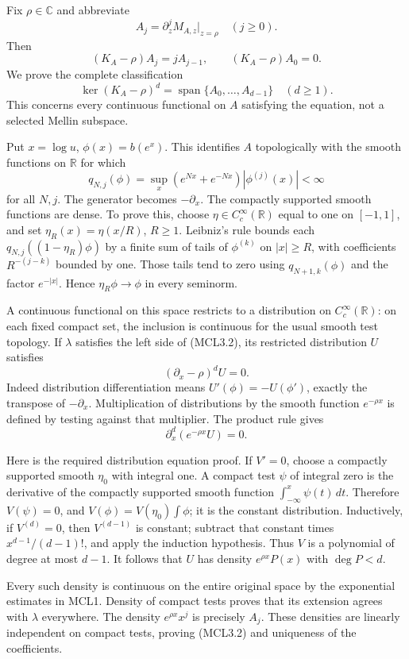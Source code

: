 Fix \(\rho\in\mathbb C\) and abbreviate \[
 A_j=\partial_z^jM_{A,z}\big|_{z=\rho}\quad(j\ge0).
\] Then \[
 (K_A-\rho)A_j=jA_{j-1},\qquad
 (K_A-\rho)A_0=0.
 \tag{MCL3.1}
\] We prove the complete classification \[
 \boxed{\ker(K_A-\rho)^d
       =\operatorname{span}\{A_0,\ldots,A_{d-1}\}
       \quad(d\ge1).}
 \tag{MCL3.2}
\] This concerns every continuous functional on \(A\) satisfying the
equation, not a selected Mellin subspace.

Put \(x=\log u\), \(\phi(x)=b(e^x)\). This identifies \(A\)
topologically with the smooth functions on \(\mathbb R\) for which \[
 q_{N,j}(\phi)=\sup_x(e^{Nx}+e^{-Nx})|\phi^{(j)}(x)|<\infty
\] for all \(N,j\). The generator becomes \(-\partial_x\). The compactly
supported smooth functions are dense. To prove this, choose
\(\eta\in C_c^\infty(\mathbb R)\) equal to one on \([-1,1]\), and set
\(\eta_R(x)=\eta(x/R)\), \(R\ge1\). Leibniz's rule bounds each
\(q_{N,j}((1-\eta_R)\phi)\) by a finite sum of tails of \(\phi^{(k)}\)
on \(|x|\ge R\), with coefficients \(R^{-(j-k)}\) bounded by one. Those
tails tend to zero using \(q_{N+1,k}(\phi)\) and the factor
\(e^{-|x|}\). Hence \(\eta_R\phi\to\phi\) in every seminorm.

A continuous functional on this space restricts to a distribution on
\(C_c^\infty(\mathbb R)\): on each fixed compact set, the inclusion is
continuous for the usual smooth test topology. If \(\lambda\) satisfies
the left side of (MCL3.2), its restricted distribution \(U\) satisfies
\[
 (\partial_x-\rho)^dU=0.
\] Indeed distribution differentiation means \(U'(\phi)=-U(\phi')\),
exactly the transpose of \(-\partial_x\). Multiplication of
distributions by the smooth function \(e^{-\rho x}\) is defined by
testing against that multiplier. The product rule gives \[
 \partial_x^d(e^{-\rho x}U)=0.
\]

Here is the required distribution equation proof. If \(V'=0\), choose a
compactly supported smooth \(\eta_0\) with integral one. A compact test
\(\psi\) of integral zero is the derivative of the compactly supported
smooth function \(\int_{-\infty}^x\psi(t)\,dt\). Therefore
\(V(\psi)=0\), and \(V(\phi)=V(\eta_0)\int\phi\); it is the constant
distribution. Inductively, if \(V^{(d)}=0\), then \(V^{(d-1)}\) is
constant; subtract that constant times \(x^{d-1}/(d-1)!\), and apply the
induction hypothesis. Thus \(V\) is a polynomial of degree at most
\(d-1\). It follows that \(U\) has density \(e^{\rho x}P(x)\) with
\(\deg P<d\).

Every such density is continuous on the entire original space by the
exponential estimates in MCL1. Density of compact tests proves that its
extension agrees with \(\lambda\) everywhere. The density
\(e^{\rho x}x^j\) is precisely \(A_j\). These densities are linearly
independent on compact tests, proving (MCL3.2) and uniqueness of the
coefficients.

